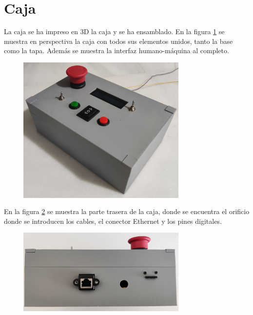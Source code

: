 \section{Caja}

La caja se ha impreso en 3D la caja y se ha ensamblado. En la figura \ref{fig:cajaexterior}
se muestra en perspectiva la caja con todos sus elementos unidos, tanto la base como la tapa. 
Además se muestra la interfaz humano-máquina al completo.

\begin{figure}[hbtp]%
    \centering 
        \includegraphics[width=0.75\textwidth]{07-resultados/cajaexterior.jpg}
    \caption{}
    \label{fig:cajaexterior} 
\end{figure}

En la figura \ref{fig:cajatrasero} se muestra la parte trasera de la caja, donde se encuentra
el orificio donde se introducen los cables, el conector Ethernet y los pines digitales.

\begin{figure}[hbtp]%
    \centering 
        \includegraphics[width=0.75\textwidth]{07-resultados/cajatrasero.jpg}
    \caption{}
    \label{fig:cajatrasero} 
\end{figure}




